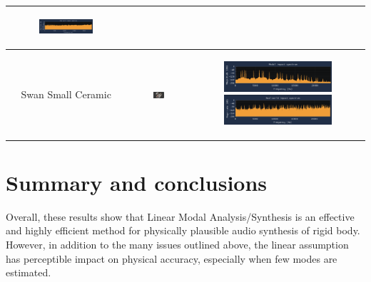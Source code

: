 \documentclass[12pt]{article}
\begin{document}
\begin{table}[!ht]
\begin{tabular}{|c|c|c|}
\begin{subfigure}{0.3\linewidth}
    \includegraphics[width=\linewidth]{images/impacts/PlasticScoopReal.png}
  \end{subfigure} \\ \hline
  Swan Small Ceramic & \includegraphics[width=0.2\textwidth]{images/impacts/SwanSmallCeramicMesh.png} & 
  \begin{subfigure}{0.3\linewidth}
    \includegraphics[width=\linewidth]{images/impacts/SwanSmallCeramicModal.png}
    \includegraphics[width=\linewidth]{images/impacts/SwanSmallCeramicReal.png}
  \end{subfigure} \\ \hline
  \end{tabular}
\end{table}

\section{Summary and conclusions}

Overall, these results show that Linear Modal Analysis/Synthesis is an effective and highly efficient method for physically plausible audio synthesis of rigid body.
However, in addition to the many issues outlined above, the linear assumption has perceptible impact on physical accuracy, especially when few modes are estimated.
\end{document}
